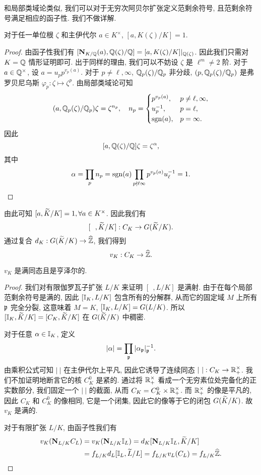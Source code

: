 和局部类域论类似, 我们可以对于无穷次阿贝尔扩张定义范剩余符号, 且范剩余符号满足相应的函子性. 我们不做详解.

\begin{proposition}{}{}
对于任一单位根 $\zeta$ 和主伊代尔 $a\in K^\times$, $[a,K(\zeta)/K]=1$.
\end{proposition}
\begin{proof}
由函子性我们有 $[{\mathbf{N}}_{K/{\mathbb{Q}}}(a),{\mathbb{Q}}(\zeta)/{\mathbb{Q}}]=[a,K(\zeta)/K]|_{{\mathbb{Q}}(\zeta)}$. 因此我们只需对 $K={\mathbb{Q}}$ 情形证明即可. 出于同样的理由, 我们可以不妨设 $\zeta$ 是 $\ell^m\neq 2$ 阶. 对于 $a\in{\mathbb{Q}}^\times$, 设 $a=u_pp^{v_p(a)}$. 对于 $p\neq \ell,\infty$, ${\mathbb{Q}}_p(\zeta)/{\mathbb{Q}}_p$ 非分歧, $(p,{\mathbb{Q}}_p(\zeta)/{\mathbb{Q}}_p)$ 是弗罗贝尼乌斯 $\varphi_p:\zeta\mapsto \zeta^p$. 由局部类域论可知
  \[(a,{\mathbb{Q}}_p(\zeta)/{\mathbb{Q}}_p)\zeta=\zeta^{n_p},\quad n_p=\begin{cases}
    p^{v_p(a)}, & p\neq \ell,\infty,\\
    u_p^{-1},   & p=\ell,\\
    {\mathrm{sgn}}(a),    & p=\infty.
  \end{cases}\]
因此
  \[[a,{\mathbb{Q}}(\zeta)/{\mathbb{Q}}]\zeta=\zeta^\alpha,\]
其中
  \[\alpha=\prod_p n_p={\mathrm{sgn}}(a)\prod_{p\nmid \ell\infty} p^{v_p(a)}u_\ell^{-1}=1.\]
\end{proof}

由此可知 $[a,\widetilde K/K]=1,\forall a\in K^\times$.
因此我们有
  \[[~~,\widetilde K/K]:C_K\to G(\widetilde K/K).\]
通过复合 $d_K:G(\widetilde K/K)\to\widehat{{\mathbb{Z}}}$, 我们得到
  \[v_K:C_K\to\widehat{{\mathbb{Z}}}.\]
\begin{proposition}{}{}
$v_K$ 是满同态且是亨泽尔的.
\end{proposition}
\begin{proof}
我们对有限伽罗瓦子扩张 $L/K$ 来证明 $[~~,L/K]$ 是满射. 由于在每个局部范剩余符号是满的, 因此 $[{\mathbb{I}}_K,L/K]$ 包含所有的分解群, 从而它的固定域 $M$ 上所有 ${\mathfrak{p}}$ 完全分裂, 这意味着 $M=K$, $[{\mathbb{I}}_K,L/K]=G(L/K)$. 所以 $[{\mathbb{I}}_K,\widetilde K/K]=[C_K,\widetilde K/K]$ 在 $G(\widetilde K/K)$ 中稠密. 

对于任意 $\alpha\in{\mathbb{I}}_K$, 定义
  \[|\alpha|=\prod_{{\mathfrak{p}}} |\alpha_{\mathfrak{p}}|_{\mathfrak{p}}^{-1}.\]
由乘积公式可知 $|~|$ 在主伊代尔上平凡, 因此它诱导了连续同态 $|~|:C_K\to {\mathbb{R}}_+^\times$. 我们不加证明地断言它的核 $C_K^0$ 是紧的. 通过将 ${\mathbb{R}}_+^\times$ 看成一个无穷素位处完备化的正实数部分, 我们固定一个 $|~|$ 的截面, 从而 $C_K=C_K^0\times {\mathbb{R}}_+^\times$. 而 ${\mathbb{R}}_+^\times$ 的像是平凡的, 因此 $C_K$ 和 $C_K^0$ 的像相同, 它是一个闭集, 因此它的像等于它的闭包 $G(\widetilde K/K)$. 故 $v_K$ 是满的.

对于有限扩张 $L/K$, 由函子性我们有
  \[\begin{split}
    v_K({\mathbf{N}}_{L/K}C_L)&=v_K({\mathbf{N}}_{L/K}{\mathbb{I}}_L)=d_K[{\mathbf{N}}_{L/K}{\mathbb{I}}_L,\widetilde K/K]\\
    &=f_{L/K}d_L [{\mathbb{I}}_L,\widetilde L/L]=f_{L/K}v_L(C_L)=f_{L/K}\widehat {{\mathbb{Z}}}.
  \end{split}\]
\end{proof}


